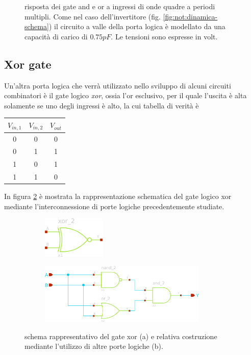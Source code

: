 	\begin{figure}[bht]
		\centering
		
		\caption{risposta dei gate and e or a ingressi di onde quadre a periodi multipli. Come nel caso dell'invertitore (fig. \ref{fig:not:dinamica-schema}) il circuito a valle della porta logica è modellato da una capacità di carico di $0.75pF$. Le tensioni sono espresse in volt.}
		\label{fig:andor:dinamica}
	\end{figure}

\subsection*{Xor gate}
	Un'altra porta logica che verrà utilizzato nello sviluppo di alcuni circuiti combinatori è il gate logico \textit{xor}, ossia l'or esclusivo, per il quale l'uscita è alta solamente se uno degli ingressi è alto, la cui tabella di verità è
	\begin{center}
		\begin{tabular}{c c | c}
			$V_{in,1}$ & $V_{in,2}$ & $V_{out}$ \\ \hline
			0 & 0 & 0 \\
			0 & 1 & 1 \\
			1 & 0 & 1 \\
			1 & 1 & 0 \\
		\end{tabular}
	\end{center}
	
	In figura \ref{fig:xor} è mostrata la rappresentazione schematica del gate logico xor mediante l'interconnessione di porte logiche precedentemente studiate.
	
	\begin{figure}[bht]
		\centering
		\begin{subfigure}{0.48\linewidth}
			\centering
			\includegraphics[width=3cm]{Immagini/xor-gate-simple}
			\caption{}
		\end{subfigure}
		\begin{subfigure}{0.48\linewidth}
			\centering
			\includegraphics[width=8cm]{Immagini/xor-gate}
			\caption{}
		\end{subfigure}
		\caption{schema rappresentativo del gate xor (a) e relativa costruzione mediante l'utilizzo di altre porte logiche (b).}
		\label{fig:xor}
	\end{figure}

